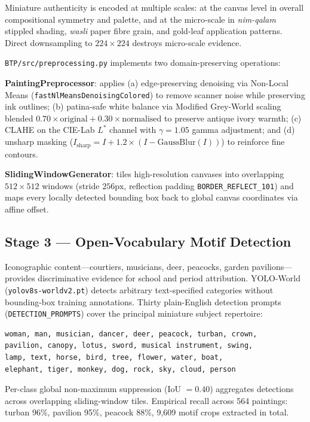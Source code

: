 \documentclass[12pt, a4paper, twoside]{article}
\begin{document}
Miniature authenticity is encoded at multiple scales: at the canvas level in overall compositional symmetry and palette, and at the micro-scale in \textit{nim-qalam} stippled shading, \textit{wasli} paper fibre grain, and gold-leaf application patterns. Direct downsampling to $224 \times 224$ destroys micro-scale evidence.

\texttt{BTP/src/preprocessing.py} implements two domain-preserving operations:

\textbf{PaintingPreprocessor}: applies (a) edge-preserving denoising via Non-Local Means (\texttt{fastNlMeansDenoisingColored}) to remove scanner noise while preserving ink outlines; (b) patina-safe white balance via Modified Grey-World scaling blended $0.70 \times \text{original} + 0.30 \times \text{normalised}$ to preserve antique ivory warmth; (c) CLAHE on the CIE-Lab $L^*$ channel with $\gamma = 1.05$ gamma adjustment; and (d) unsharp masking ($I_{\text{sharp}} = I + 1.2 \times (I - \text{GaussBlur}(I))$) to reinforce fine contours.

\textbf{SlidingWindowGenerator}: tiles high-resolution canvases into overlapping $512 \times 512$ windows (stride $256\text{px}$, reflection padding \texttt{BORDER\_REFLECT\_101}) and maps every locally detected bounding box back to global canvas coordinates via affine offset.

\subsection{Stage 3 — Open-Vocabulary Motif Detection}

Iconographic content—courtiers, musicians, deer, peacocks, garden pavilions—provides discriminative evidence for school and period attribution. YOLO-World (\texttt{yolov8s-worldv2.pt}) detects arbitrary text-specified categories without bounding-box training annotations. Thirty plain-English detection prompts (\texttt{DETECTION\_PROMPTS}) cover the principal miniature subject repertoire:

\begin{lstlisting}[language={}, caption={YOLO-World detection prompts for miniature iconography}, label={lst:prompts}]
woman, man, musician, dancer, deer, peacock, turban, crown,
pavilion, canopy, lotus, sword, musical instrument, swing,
lamp, text, horse, bird, tree, flower, water, boat,
elephant, tiger, monkey, dog, rock, sky, cloud, person
\end{lstlisting}

Per-class global non-maximum suppression (IoU $= 0.40$) aggregates detections across overlapping sliding-window tiles. Empirical recall across 564 paintings: turban 96\%, pavilion 95\%, peacock 88\%, 9,609 motif crops extracted in total.
\end{document}
